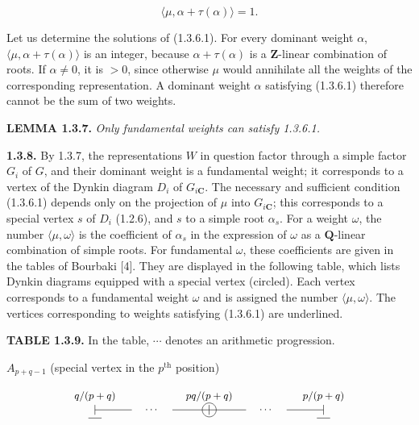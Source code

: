 \documentclass[10pt,a4paper]{article}
\begin{document}
\[
\langle\mu,\alpha+\tau(\alpha)\rangle=1. \tag{1.3.6.1}
\]

Let us determine the solutions of (1.3.6.1). For every dominant weight \(\alpha\), \(\langle\mu,\alpha+\tau(\alpha)\rangle\) is an integer, because \(\alpha+\tau(\alpha)\) is a \(\mathbf Z\)-linear combination of roots. If \(\alpha\ne0\), it is \(>0\), since otherwise \(\mu\) would annihilate all the weights of the corresponding representation. A dominant weight \(\alpha\) satisfying (1.3.6.1) therefore cannot be the sum of two weights.

\textbf{LEMMA 1.3.7.} \emph{Only fundamental weights can satisfy 1.3.6.1.}

\textbf{1.3.8.} By 1.3.7, the representations \(W\) in question factor through a simple factor \(G_i\) of \(G\), and their dominant weight is a fundamental weight; it corresponds to a vertex of the Dynkin diagram \(D_i\) of \(G_{i\mathbf C}\). The necessary and sufficient condition (1.3.6.1) depends only on the projection of \(\mu\) into \(G_{i\mathbf C}\); this corresponds to a special vertex \(s\) of \(D_i\) (1.2.6), and \(s\) to a simple root \(\alpha_s\). For a weight \(\omega\), the number \(\langle\mu,\omega\rangle\) is the coefficient of \(\alpha_s\) in the expression of \(\omega\) as a \(\mathbf Q\)-linear combination of simple roots. For fundamental \(\omega\), these coefficients are given in the tables of Bourbaki {[}4{]}. They are displayed in the following table, which lists Dynkin diagrams equipped with a special vertex (circled). Each vertex corresponds to a fundamental weight \(\omega\) and is assigned the number \(\langle\mu,\omega\rangle\). The vertices corresponding to weights satisfying (1.3.6.1) are underlined.

\textbf{TABLE 1.3.9.} In the table, \(\cdots\) denotes an arithmetic progression.

\(A_{p+q-1}\) (special vertex in the \(p^{\mathrm{th}}\) position)

\[
\begin{tikzpicture}[x=1.15cm,y=0.75cm,baseline=(current bounding box.center),every node/.style={font=\small}]
\draw (0,0)--(1,0); \node at (1.55,0) {$\cdots$}; \draw (2.1,0)--(3.1,0); \node[circle,draw,inner sep=1.2pt] at (3.1,0) {$\vert$}; \draw (3.1,0)--(4.1,0); \node at (4.65,0) {$\cdots$}; \draw (5.2,0)--(6.2,0);
\node at (0,0) {$\vert$}; \node at (6.2,0) {$\vert$};
\node[above,yshift=4pt] at (0,0) {$q/(p+q)$}; \node[above,yshift=4pt] at (3.1,0) {$pq/(p+q)$}; \node[above,yshift=4pt] at (6.2,0) {$p/(p+q)$};
\draw (-0.18,-0.34)--(0.18,-0.34); \draw (6.02,-0.34)--(6.38,-0.34);
\end{tikzpicture}
\]
\end{document}
